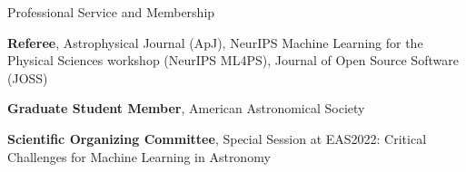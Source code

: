 \begin{cvlist_mid}{Professional Service and Membership}
\item[] \textbf{Referee}, Astrophysical Journal (ApJ), NeurIPS Machine Learning for the Physical Sciences workshop (NeurIPS ML4PS), Journal of Open Source Software (JOSS)
\item[] \textbf{Graduate Student Member}, American Astronomical Society
\item[] \textbf{Scientific Organizing Committee}, Special Session at EAS2022: Critical Challenges for Machine Learning in Astronomy
\end{cvlist_mid}